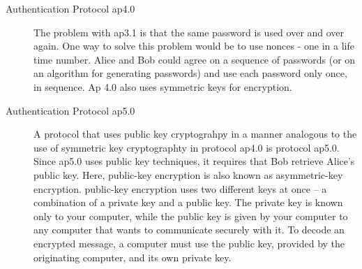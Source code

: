 \documentclass[twoside]{article}
\begin{document}
\begin{description}
\item[Authentication Protocol ap4.0]The problem with ap3.1 is that the same password is used over and over again. One way to solve this problem would be to use nonces - one in a life time number. Alice and Bob could agree on a sequence of passwords (or on an algorithm for generating passwords) and use each password only once, in sequence. Ap 4.0 also uses symmetric keys for encryption.

\item[Authentication Protocol ap5.0] A protocol that uses public key cryptograhpy in a manner analogous to the use of symmetric key cryptographty in protocol ap4.0 is protocol ap5.0. Since ap5.0 uses public key techniques, it requires that Bob retrieve Alice's public key. Here, public-key encryption is also known as asymmetric-key encryption. public-key encryption uses two different keys at once -- a combination of a private key and a public key. The private key is known only to your computer, while the public key is given by your computer to any computer that wants to communicate securely with it. To decode an encrypted message, a computer must use the public key, provided by the originating computer, and its own private key. 

\end{description}
\end{document}
